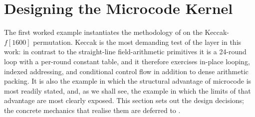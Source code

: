 %
%

\section{Designing the Microcode Kernel}
\label{sec:keccak-design}

The first worked example instantiates the methodology of
 on the Keccak-$f[1600]$ permutation. Keccak is the most
demanding test of the layer in this work: in contrast to the straight-line
field-arithmetic primitives it is a 24-round loop with a per-round constant
table, and it therefore exercises in-place looping, indexed addressing, and
conditional control flow in addition to dense arithmetic packing. It is also
the example in which the structural advantage of microcode is most readily
stated, and, as we shall see, the example in which the limits of that advantage
are most clearly exposed. This section sets out the design decisions; the
concrete mechanics that realise them are deferred to .

